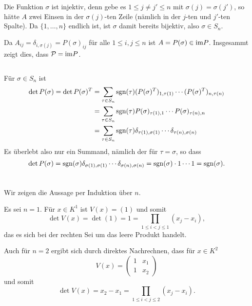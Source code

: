 \documentclass[a4paper,10pt]{article}
\begin{document}
Die Funktion $\sigma$ ist injektiv, denn gebe es $1 \leq j \neq j' \leq n$ mit $\sigma(j) = \sigma(j')$, so hätte $A$ zwei Einsen in der $\sigma(j)$-ten Zeile (nämlich in der $j$-ten und $j'$-ten Spalte). Da $\{1, \dotsc, n\}$ endlich ist, ist $\sigma$ damit bereits bijektiv, also $\sigma \in S_n$.

Da $A_{ij} = \delta_{i,\sigma(j)} = P(\sigma)_{ij}$ für alle $1 \leq i,j \leq n$ ist $A = P(\sigma) \in \mathrm{im} P$. Insgesammt zeigt dies, dass $\mathcal{P} = \mathrm{im} P$.


\subsection{}
Für $\sigma \in S_n$ ist
\begin{align*}
 \det P(\sigma)
 = \det P(\sigma)^T
 &= \sum_{\tau \in S_n} \operatorname{sgn}(\tau) (P(\sigma)^T)_{1, \tau(1)} \dotsm (P(\sigma)^T)_{n, \tau(n)} \\
 &= \sum_{\tau \in S_n} \operatorname{sgn}(\tau) P(\sigma)_{\tau(1), 1} \dotsm P(\sigma)_{\tau(n),n} \\
 &= \sum_{\tau \in S_n} \operatorname{sgn}(\tau) \delta_{\tau(1), \sigma(1)} \dotsm \delta_{\tau(n),\sigma(n)}
\end{align*}
Es überlebt also nur ein Summand, nämlich der für $\tau = \sigma$, so dass
\[
 \det P(\sigma)
 = \operatorname{sgn}(\sigma) \delta_{\sigma(1), \sigma(1)} \dotsm \delta_{\sigma(n),\sigma(n)}
 = \operatorname{sgn}(\sigma) \cdot 1 \dotsm 1
 = \operatorname{sgn}(\sigma).
\]





\section{}
Wir zeigen die Aussage per Induktion über $n$.

\begin{ia}
 Es sei $n = 1$. Für $x \in K^1$ ist $V(x) = (1)$ und somit
 \[
  \det V(x) = \det (1) = 1 = \prod_{1 \leq i < j \leq 1} (x_j - x_i),
 \]
 das es sich bei der rechten Sei um das leere Produkt handelt.
 
 Auch für $n = 2$ ergibt sich durch direktes Nachrechnen, dass für $x \in K^2$
 \[
  V(x) =
  \begin{pmatrix}
   1 & x_1 \\
   1 & x_2
  \end{pmatrix}
 \]
 und somit
 \[
  \det V(x) = x_2 - x_1 =  \prod_{1 \leq i < j \leq 2} (x_j - x_i).
 \]
\end{ia}
\end{document}
